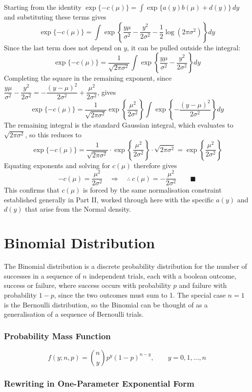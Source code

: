 \documentclass[12pt,a4paper]{report}
\begin{document}
Starting from the identity $\exp\{-c(\mu)\} = \int \exp\{a(y)b(\mu) + d(y)\}\,dy$ and substituting these terms gives
\[
\exp\{-c(\mu)\} = \int \exp\left\{\frac{y\mu}{\sigma^2} - \frac{y^2}{2\sigma^2} - \frac{1}{2}\log(2\pi\sigma^2)\right\} dy
\]
Since the last term does not depend on $y$, it can be pulled outside the integral:
\[
\exp\{-c(\mu)\} = \frac{1}{\sqrt{2\pi\sigma^2}} \int \exp\left\{\frac{y\mu}{\sigma^2} - \frac{y^2}{2\sigma^2}\right\} dy
\]
Completing the square in the remaining exponent, since $\dfrac{y\mu}{\sigma^2} - \dfrac{y^2}{2\sigma^2} = -\dfrac{(y-\mu)^2}{2\sigma^2} + \dfrac{\mu^2}{2\sigma^2}$, gives
\[
\exp\{-c(\mu)\} = \frac{1}{\sqrt{2\pi\sigma^2}} \exp\left\{\frac{\mu^2}{2\sigma^2}\right\} \int \exp\left\{-\frac{(y-\mu)^2}{2\sigma^2}\right\} dy
\]
The remaining integral is the standard Gaussian integral, which evaluates to $\sqrt{2\pi\sigma^2}$, so this reduces to
\[
\exp\{-c(\mu)\} = \frac{1}{\sqrt{2\pi\sigma^2}} \cdot \exp\left\{\frac{\mu^2}{2\sigma^2}\right\} \cdot \sqrt{2\pi\sigma^2} = \exp\left\{\frac{\mu^2}{2\sigma^2}\right\}
\]
Equating exponents and solving for $c(\mu)$ therefore gives
\[
-c(\mu) = \frac{\mu^2}{2\sigma^2} \quad\Longrightarrow\quad \therefore\ c(\mu) = -\frac{\mu^2}{2\sigma^2} \qquad \blacksquare
\]
This confirms that $c(\mu)$ is forced by the same normalisation constraint established generally in Part II, worked through here with the specific $a(y)$ and $d(y)$ that arise from the Normal density.

\section{Binomial Distribution}

The Binomial distribution is a discrete probability distribution for the number of successes in a sequence of $n$ independent trials, each with a boolean outcome, success or failure, where success occurs with probability $p$ and failure with probability $1-p$, since the two outcomes must sum to 1. The special case $n=1$ is the Bernoulli distribution, so the Binomial can be thought of as a generalisation of a sequence of Bernoulli trials.

\subsubsection*{Probability Mass Function}

\[
f(y;n,p) = \binom{n}{y} p^{y}(1-p)^{n-y}, \qquad y = 0,1,\dots,n
\]

\subsubsection*{Rewriting in One-Parameter Exponential Form}
\end{document}
